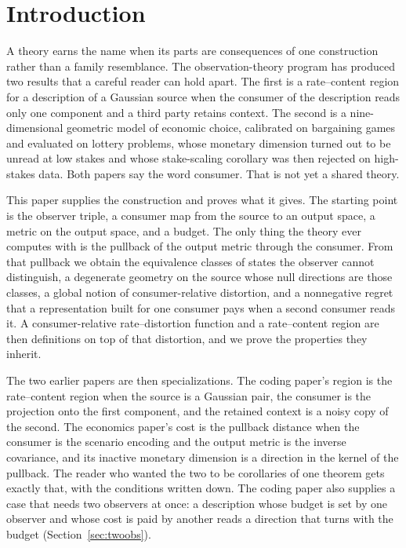 \documentclass[11pt]{article}
\theoremstyle{definition}
\theoremstyle{remark}
\begin{document}
\section{Introduction}

A theory earns the name when its parts are consequences of one construction rather than a family resemblance.
The observation-theory program has produced two results that a careful reader can hold apart.
The first is a rate--content region for a description of a Gaussian source when the consumer of the description reads only one component and a third party retains context.
The second is a nine-dimensional geometric model of economic choice, calibrated on bargaining games and evaluated on lottery problems, whose monetary dimension turned out to be unread at low stakes and whose stake-scaling corollary was then rejected on high-stakes data.
Both papers say the word consumer.
That is not yet a shared theory.

This paper supplies the construction and proves what it gives.
The starting point is the observer triple, a consumer map from the source to an output space, a metric on the output space, and a budget.
The only thing the theory ever computes with is the pullback of the output metric through the consumer.
From that pullback we obtain the equivalence classes of states the observer cannot distinguish, a degenerate geometry on the source whose null directions are those classes, a global notion of consumer-relative distortion, and a nonnegative regret that a representation built for one consumer pays when a second consumer reads it.
A consumer-relative rate--distortion function and a rate--content region are then definitions on top of that distortion, and we prove the properties they inherit.

The two earlier papers are then specializations.
The coding paper's region is the rate--content region when the source is a Gaussian pair, the consumer is the projection onto the first component, and the retained context is a noisy copy of the second.
The economics paper's cost is the pullback distance when the consumer is the scenario encoding and the output metric is the inverse covariance, and its inactive monetary dimension is a direction in the kernel of the pullback.
The reader who wanted the two to be corollaries of one theorem gets exactly that, with the conditions written down.
The coding paper also supplies a case that needs two observers at once: a description whose budget is set by one observer and whose cost is paid by another reads a direction that turns with the budget (Section~\ref{sec:twoobs}).
\end{document}
